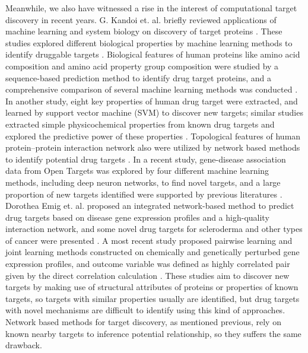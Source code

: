     Meanwhile, we also have witnessed a rise in the interest of computational target discovery in recent years. G. Kandoi et. al. briefly reviewed applications of machine learning and system biology on discovery of target proteins \cite{kandoi2015prediction}. These studies explored different biological properties by machine learning methods to identify druggable targets \cite{bakheet2009properties,fauman2011structure,li2007prediction}. Biological features of human proteins like amino acid composition and amino acid property group composition were studied by a sequence-based prediction method to identify drug target proteins, and a comprehensive comparison of several machine learning methods was conducted \cite{kumari2015identification}. In another study, eight key properties of human drug target were extracted, and learned by support vector machine (SVM) to discover new targets; similar studies extracted simple physicochemical properties from known drug targets and explored the predictive power of these properties \cite{li2007prediction,emig2013drug}. Topological features of human protein–protein interaction network also were utilized by network based methods to identify potential drug targets \cite{li2015large}. In a recent study, gene-disease association data from Open Targets was explored by four different machine learning methods, including deep neuron networks, to find novel targets, and a large proportion of new targets identified were supported by previous literatures \cite{ferrero2017silico}. Dorothea Emig et. al. proposed an integrated network-based method to predict drug targets based on disease gene expression profiles and a high-quality interaction network, and some novel drug targets for scleroderma and other types of cancer were presented \cite{emig2013drug}. A most recent study proposed pairwise learning and joint learning methods constructed on chemically and genetically perturbed gene expression profiles, and outcome variable was defined as highly correlated pair given by the direct correlation calculation \cite{sawada2018predicting}. These studies aim to discover new targets by making use of structural attributes of proteins or properties of known targets, so targets with similar properties usually are identified, but drug targets with novel mechanisms are difficult to identify using this kind of approaches. Network based methods for target discovery, as mentioned previous, rely on known nearby targets to inference potential relationship, so they suffers the same drawback. 

